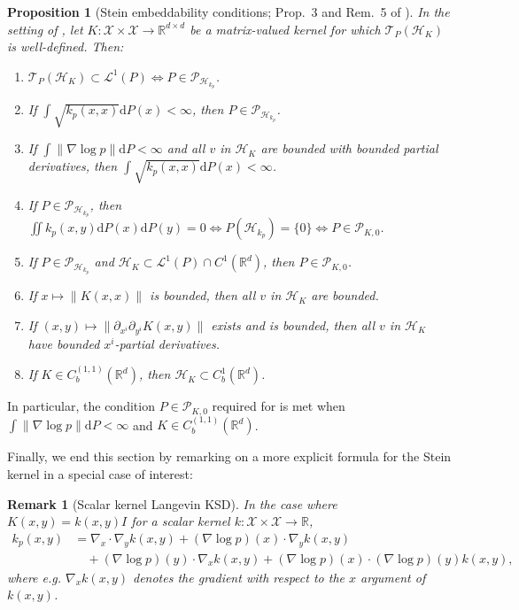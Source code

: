 \documentclass[12pt,paper=letter]{scrreprt}
\newtheorem{proposition}{Proposition}[chapter]
\newtheorem{remark}{Remark}[chapter]
\def\R{\mathbb{R}}
\def\iff{\Leftrightarrow}
\newcommand{\p}{p} %
\newcommand{\langevin}{\mathcal{T}_P} %
\renewcommand{\k}{k}
\newcommand{\Kb}{K} %
\newcommand{\ks}{\k_{\p}}%
\newcommand{\dd}{\mathrm{d}}
\def\H{\mathcal{H}}
\begin{document}
\begin{proposition}[Stein embeddability conditions; Prop.~3 and Rem.~5 of \citealp{barp2022targeted}]\label{thm:embeddability_conditions}
In the setting of , let $K : \mathcal{X} \times \mathcal{X} \rightarrow \mathbb{R}^{d \times d}$ be a matrix-valued kernel for which $\langevin(\H_K)$ is well-defined.
Then:
\begin{enumerate}[label=\textup{(\alph*)}]
\item $\langevin (\H_{\Kb}) \subset \mathcal{L}^1(P) \iff P\in \mathcal{P}_{\mathcal{H}_{k_p}}$.
\item If $\int \sqrt{k_p(x,x)} \mathrm{d}P(x) < \infty$, then $P \in \mathcal{P}_{\mathcal{H}_{k_p}}$.
\item If $\int \|\nabla \log p\| \mathrm{d}P < \infty$ and all $v$ in $\H_K$ are bounded with bounded partial derivatives, then $\int \sqrt{k_p(x,x)} \mathrm{d}P(x) < \infty$.
\item If $P\in \mathcal{P}_{\mathcal{H}_{k_p}}$, then
$\iint \ks(x,y) \dd P(x)\dd P(y) = 0 \Leftrightarrow P( \H_{\ks})=\{0\} \Leftrightarrow P \in \mathcal{P}_{K,0}$.
\item If $P\in \mathcal{P}_{\mathcal{H}_{k_p}}$ and $\H_K \subset \mathcal{L}^1(P) \cap C^1(\mathbb{R}^d)$, then $P \in \mathcal{P}_{K,0}$.
\item If $x \mapsto \|\Kb(x,x)\|$ is bounded, then all $v$ in $\H_K$ are bounded.
\item If $(x,y) \mapsto \|\partial_{x^i}\partial_{y^i} K(x,y)\|$ exists and is bounded,
then  all $v$ in $\H_K$ have bounded $x^i$-partial derivatives.
\item If $K \in C^{(1,1)}_{b}(\R^d)$, then $\H_K \subset C^{1}_{b}(\R^d)$.
\end{enumerate}
\end{proposition}

\noindent In particular, the condition $P \in \mathcal{P}_{K,0}$ required for  is met when $\int \|\nabla \log p\| \mathrm{d}P < \infty$ and $K \in C_b^{(1,1)}(\mathbb{R}^d)$.

Finally, we end this section by remarking on a more explicit formula for the Stein kernel in a special case of interest:

\begin{remark}[Scalar kernel Langevin KSD]
    In the case where $K(x,y) = k(x,y) I$ for a scalar kernel $k : \mathcal{X} \times \mathcal{X} \rightarrow \mathbb{R}$, 
    \begin{align*} 
        k_p(x,y) & = \nabla_x \cdot \nabla_y k(x,y) + (\nabla \log p)(x) \cdot \nabla_y k(x,y) \\
        & \quad + (\nabla \log p)(y) \cdot \nabla_x k(x,y) + (\nabla \log p)(x) \cdot (\nabla \log p)(y) k(x,y) ,
    \end{align*}
    where e.g. $\nabla_x k(x,y)$ denotes the gradient with respect to the $x$ argument of $k(x,y)$.
\end{remark}
\end{document}
